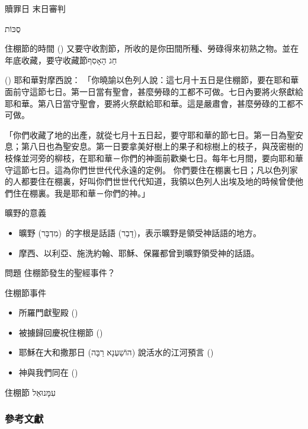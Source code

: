 \documentclass{beamer}
\newcommand{\topic}[1]{
  \begin{frame}
    \centering
    \vspace*{1cm}
    {\fontsize{40}{48}\selectfont #1\par}
    \vfill
  \end{frame}
}
\newcommand{\question}[1]{
  \begin{frame}{問題}
    \centering
    \vspace*{1cm}
    \huge #1？\par
    \vfill
  \end{frame}
}
\newcommand{\conclusion}[2]{
  \begin{frame}
    \centering
    \vspace*{1cm}
    {\fontsize{40}{48}\selectfont #1 \textemdash #2\par}
    \vfill
  \end{frame}
}
\newcommand{\parvspace}{\par\vspace{0.5em}}
\begin{document}
\conclusion{贖罪日}{末日審判}

\topic{\texthebrew{סֻכּוֹת}}

\begin{frame}{住棚節的時間}
  () 又要守收割節，所收的是你田間所種、勞碌得來初熟之物。並在年底收藏，要守\alert{收藏節\texthebrew{חַג הָאָסִף}}\parvspace
  () 耶和華對摩西說： 「你曉諭以色列人說：這\alert{七月十五日是住棚節，要在耶和華面前守這節七日}。第一日當有聖會，甚麼勞碌的工都不可做。七日內要將火祭獻給耶和華。\alert{第八日當守聖會}，要將火祭獻給耶和華。這是嚴肅會，甚麼勞碌的工都不可做。\parvspace
  \textellipsis{}\parvspace
  「你們收藏了地的出產，就\alert{從七月十五日起，要守耶和華的節七日。第一日為聖安息；第八日也為聖安息}。第一日要拿美好樹上的果子和棕樹上的枝子，與茂密樹的枝條並河旁的柳枝，在耶和華－你們的神面前歡樂七日。每年七月間，要向耶和華守這節七日。這為你們世世代代永遠的定例。 \alert{你們要住在棚裏七日；凡以色列家的人都要住在棚裏，好叫你們世世代代知道，我領以色列人出埃及地的時候曾使他們住在棚裏。我是耶和華－你們的神}。」\parvspace
\end{frame}

\begin{frame}{曠野的意義}
  \begin{itemize}
    \item 曠野 (\texthebrew{מִדְבָּר})\ 的字根是話語 (\texthebrew{דָבַר})，表示曠野是領受神話語的地方。
    \item 摩西、以利亞、施洗約翰、耶穌、保羅都曾到曠野領受神的話語。
  \end{itemize}
\end{frame}

\question{住棚節發生的聖經事件}

\begin{frame}{住棚節事件}
  \begin{itemize}
    \item 所羅門獻聖殿 ()
    \item 被擄歸回慶祝住棚節 ()
    \item 耶穌在大和撒那日 (\texthebrew{הוֹשַׁעְנָא רַבָּה}) 說活水的江河預言 ()\parencite{YeshuaInSukkot, 大和撒那日}
    \item 神與我們同在 ()
  \end{itemize}
\end{frame}

\conclusion{住棚節}{\texthebrew{עִמָּנוּאֵל}}

\begin{frame}[allowframebreaks]
  \frametitle{參考文獻}
  \printbibliography
\end{frame}
\end{document}

